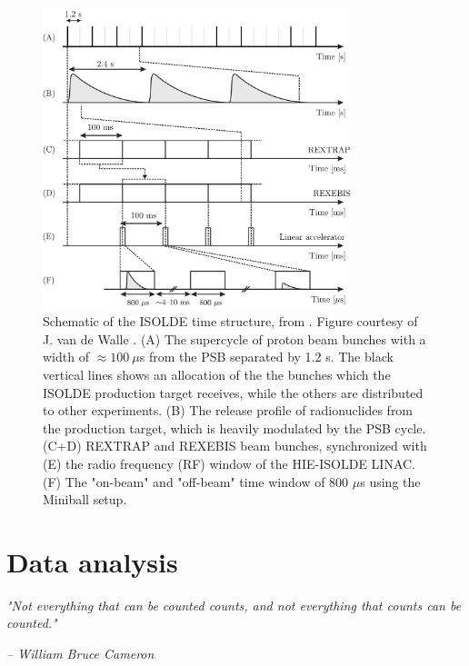 \documentclass[twoside,english]{uiofysmaster/uiofysmaster}
\begin{document}
\begin{figure}[htb]
	\centering
	\includegraphics[width=0.8\textwidth]{Images/Time-structure.png}
	\caption{Schematic of the ISOLDE time structure, from \cite{Gaffney}. Figure courtesy of J. van de Walle \cite{HI-TDR}. (A) The supercycle of proton beam bunches with a width of $\approx 100 ~\mu$s from the PSB separated by 1.2 s. The black vertical lines shows an allocation of the the bunches which the ISOLDE production target receives, while the others are distributed to other experiments. (B) The release profile of radionuclides from the production target, which is heavily modulated by the PSB cycle. (C+D) REXTRAP and REXEBIS beam bunches, synchronized with (E) the radio frequency (RF) window of the HIE-ISOLDE LINAC. (F) The "on-beam" and "off-beam" time window of 800 $\mu$s using the Miniball setup.}
	\label{fig:ITS}
\end{figure}




\chapter{Data analysis}\label{ch:DA}
\epigraph{\textit{"Not everything that can be counted counts, and not everything that counts can be counted."}}{\textit{– William Bruce Cameron}}
\end{document}
